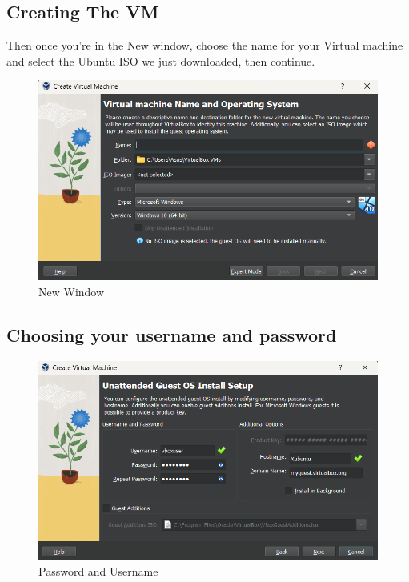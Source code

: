 \documentclass{article}
\begin{document}
    \subsection*{Creating The VM}
    Then once you're in the New window, choose the name for your Virtual machine and select the Ubuntu ISO we just downloaded, then continue.
    \begin{figure}[H]
        \centering
        \includegraphics{Pics/New_Window.png}
        \caption{New Window}
    \end{figure}
    \subsection*{Choosing your username and password}
    \begin{figure}[H]
        \centering
        \includegraphics{Pics/Next_1.png}
        \caption{Password and Username}
    \end{figure}
\end{document}
